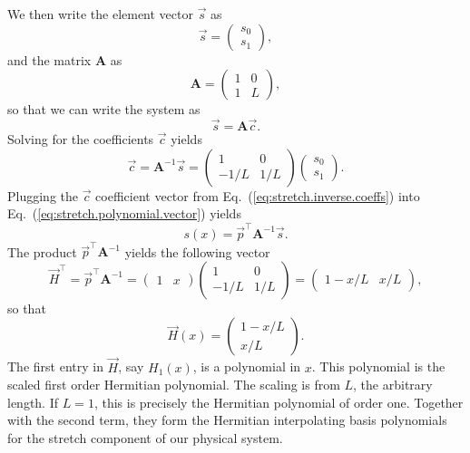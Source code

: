 We then write the element vector $\vec s$ as
\begin{equation}
\vec s = 
\begin{pmatrix}
s_0 \\
s_1
\end{pmatrix},
\end{equation}
and the matrix $\mathbf{A}$ as
\begin{equation}
\mathbf A = 
\begin{pmatrix}
1 & 0 \\
1 & L
\end{pmatrix},
\end{equation}
so that we can write the system as
\begin{equation}
\vec{s} = \mathbf{A}\vec{c}.
\end{equation}
Solving for the coefficients $\vec{c}$ yields
\begin{equation}
\vec{c} = \mathbf{A}^{-1}\vec{s} = 
\begin{pmatrix}
1 & 0 \\
-1/L & 1/L
\end{pmatrix}
\begin{pmatrix}
s_0 \\
s_1
\end{pmatrix}.
\label{eq:stretch.inverse.coeffs}
\end{equation}
Plugging the $\vec{c}$ coefficient vector from Eq.~(\ref{eq:stretch.inverse.coeffs}) into Eq.~(\ref{eq:stretch.polynomial.vector}) yields
\begin{equation}
s(x) = \vec{p}^\top\mathbf{A}^{-1}\vec{s}.
\end{equation}
The product $\vec{p}^\top\mathbf{A}^{-1}$ yields the following vector
\begin{equation}
\vec{H}^\top = \vec{p}^\top\mathbf{A}^{-1} = 
\begin{pmatrix}
1 & x
\end{pmatrix}
\begin{pmatrix}
1 & 0 \\
-1/L & 1/L
\end{pmatrix} = 
\begin{pmatrix}
1-x/L & x/L
\end{pmatrix},
\end{equation}
so that
\begin{equation}
\vec H(x) =
\begin{pmatrix}
1-x/L \\
x/L
\end{pmatrix}.
\end{equation}
The first entry in $\vec H$, say $H_1(x)$, is a polynomial in $x$. This polynomial is the scaled first order Hermitian polynomial. The scaling is from $L$, the arbitrary length. If $L=1$, this is precisely the Hermitian polynomial of order one. Together with the second term, they form the Hermitian interpolating basis polynomials for the stretch component of our physical system.

